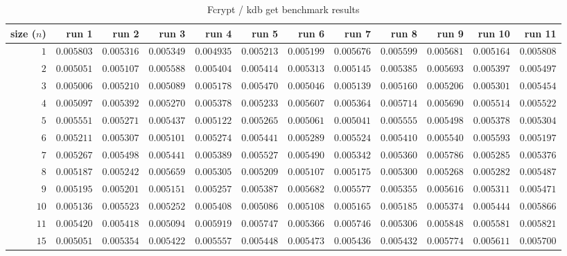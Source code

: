  
\begin{sidewaystable} \centering \caption{Fcrypt / kdb get benchmark results} \label{eval-table-fcrypt-get} \scriptsize \begin{tabular}{r|rrrrrrrrrrr} size ($n$) & run 1 & run 2 & run 3 & run 4 & run 5 & run 6 & run 7 & run 8 & run 9 & run 10 & run 11\\ \hline
$1$ & $0.005803$ & $0.005316$ & $0.005349$ & $0.004935$ & $0.005213$ & $0.005199$ & $0.005676$ & $0.005599$ & $0.005681$ & $0.005164$ & $0.005808$ \\
$2$ & $0.005051$ & $0.005107$ & $0.005588$ & $0.005404$ & $0.005414$ & $0.005313$ & $0.005145$ & $0.005385$ & $0.005693$ & $0.005397$ & $0.005497$ \\
$3$ & $0.005006$ & $0.005210$ & $0.005089$ & $0.005178$ & $0.005470$ & $0.005046$ & $0.005139$ & $0.005160$ & $0.005206$ & $0.005301$ & $0.005454$ \\
$4$ & $0.005097$ & $0.005392$ & $0.005270$ & $0.005378$ & $0.005233$ & $0.005607$ & $0.005364$ & $0.005714$ & $0.005690$ & $0.005514$ & $0.005522$ \\
$5$ & $0.005551$ & $0.005271$ & $0.005437$ & $0.005122$ & $0.005265$ & $0.005061$ & $0.005041$ & $0.005555$ & $0.005498$ & $0.005378$ & $0.005304$ \\
$6$ & $0.005211$ & $0.005307$ & $0.005101$ & $0.005274$ & $0.005441$ & $0.005289$ & $0.005524$ & $0.005410$ & $0.005540$ & $0.005593$ & $0.005197$ \\
$7$ & $0.005267$ & $0.005498$ & $0.005441$ & $0.005389$ & $0.005527$ & $0.005490$ & $0.005342$ & $0.005360$ & $0.005786$ & $0.005285$ & $0.005376$ \\
$8$ & $0.005187$ & $0.005242$ & $0.005659$ & $0.005305$ & $0.005209$ & $0.005107$ & $0.005175$ & $0.005300$ & $0.005268$ & $0.005282$ & $0.005487$ \\
$9$ & $0.005195$ & $0.005201$ & $0.005151$ & $0.005257$ & $0.005387$ & $0.005682$ & $0.005577$ & $0.005355$ & $0.005616$ & $0.005311$ & $0.005471$ \\
$10$ & $0.005136$ & $0.005523$ & $0.005252$ & $0.005408$ & $0.005086$ & $0.005108$ & $0.005165$ & $0.005185$ & $0.005374$ & $0.005444$ & $0.005866$ \\
$11$ & $0.005420$ & $0.005418$ & $0.005094$ & $0.005919$ & $0.005747$ & $0.005366$ & $0.005746$ & $0.005306$ & $0.005848$ & $0.005581$ & $0.005821$ \\
$15$ & $0.005051$ & $0.005354$ & $0.005422$ & $0.005557$ & $0.005448$ & $0.005473$ & $0.005436$ & $0.005432$ & $0.005774$ & $0.005611$ & $0.005700$ \\

\end{tabular}
\end{sidewaystable}
